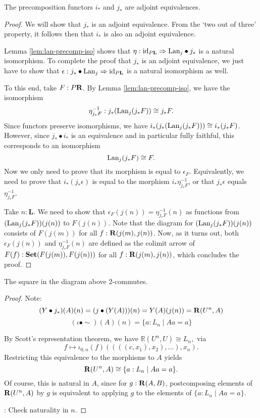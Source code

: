 \begin{lemma}
  The precomposition functors $ i_* $ and $ j_* $ are adjoint equivalences.
\end{lemma}
\begin{proof}
  We will show that $ j_* $ is an adjoint equivalence. From the `two out of three' property, it follows then that $ i_* $ is also an adjoint equivalence.

  Lemma \ref{lem:lan-precomp-iso} shows that $ \eta: \text{id}_{P \mathbf L} \Rightarrow \text{Lan}_{j} \bullet j_* $ is a natural isomorphism. To complete the proof that $ j_* $ is an adjoint equivalence, we just have to show that $ \epsilon: j_* \bullet \text{Lan}_{j} \Rightarrow \text{id}_{P \mathbf L} $ is a natural isomorphism as well.

  To this end, take $ F : P \mathbf{R} $. By Lemma \ref{lem:lan-precomp-iso}, we have the isomorphism
  \[ \eta^{-1}_{j_* F}: j_* (\text{Lan}_{j}(j_* F)) \cong j_* F. \]
  Since functors preserve isomorphisms, we have $ i_* (j_* (\text{Lan}_{j}(j_* F))) \cong i_* (j_* F) $. However, since $ j_* \bullet i_* $ is an equivalence and in particular fully faithful, this corresponds to an isomorphism
  \[ \text{Lan}_{j}(j_* F) \cong F. \]
  Now we only need to prove that its morphism is equal to $ \epsilon_F $. Equivalently, we need to prove that $ i_* (j_* \epsilon) $ is equal to the morphism $ i_* \eta_{j_* F}^{-1} $, or that $ j_* \epsilon $ equals $ \eta^{-1}_{j_* F} $.

  Take $ n : \mathbf L $. We need to show that $ \epsilon_F (j(n)) = \eta_{j_* F}^{-1}(n) $ as functions from $ (\text{Lan}_{j} (j_* F)) (j(n)) $ to $ F(j(n)) $. Note that the diagram for $ (\text{Lan}_{j} (j_* F)) (j(n)) $ consists of $ F(j(m)) $ for all $ f: \mathbf{R}(j(m), j(n)) $. Now, as it turns out, both $ \epsilon_F (j(n)) $ and $ \eta_{j_* F}^{-1}(n) $ are defined as the colimit arrow of $ F(f) : \mathbf{Set}(F(j(m)), F(j(n))) $ for all $ f: \mathbf{R}(j(m), j(n)) $, which concludes the proof.
\end{proof}

\begin{lemma}
  The square in the diagram above 2-commutes.
\end{lemma}
\begin{proof}
  Note:
  \[ (Y \bullet j_*)(A)(n) = (j \bullet (Y(A)))(n) = Y(A)(j(n)) = \mathbf{R}(U^n, A) \]
  \[ (\iota \bullet \sim)(A)(n) = \{ a : L_n \mid A a = a \} \]

  By Scott's representation theorem, we have $ \mathbb R(U^n, U) \cong L_n, $ via
  \[ f \mapsto \iota_{0, n}(f) ((((c, x_1), x_2), \dots), x_n). \]
  Restricting this equivalence to the morphisms to $ A $ yields
  \[ \mathbf{R}(U^n, A) \cong \{ a : L_n \mid A a = a \}. \]
  Of course, this is natural in $ A $, since for $ g: \mathbf{R}(A, B) $, postcomposing elements of $ \mathbf{R}(U^n, A) $ by $ g $ is equivalent to applying $ g $ to the elements of $ \{ a : L_n \mid A a = a \} $.

  \TODO: Check naturality in $ n $.
\end{proof}

